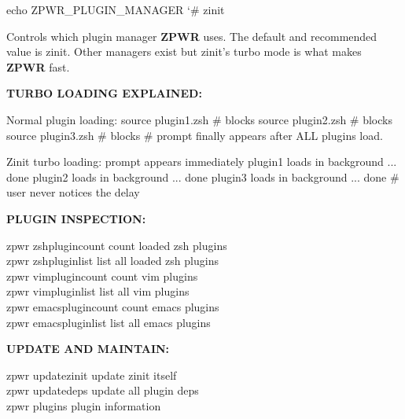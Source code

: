 \documentclass[11pt,a4paper,twoside]{book}
\begin{document}
\begin{codebox}
\color{neongreen}echo ZPWR\_PLUGIN\_MANAGER   {\char`\#} zinit\\
\end{codebox}

Controls which plugin manager \textbf{ZPWR} uses. The default and recommended value is zinit. Other managers exist but zinit's turbo mode is what makes \textbf{ZPWR} fast.


\vspace{12pt}
{\bfseries\color{neonyellow} TURBO LOADING EXPLAINED:}\vspace{4pt}

Normal plugin loading: source plugin1.zsh  \# blocks source plugin2.zsh  \# blocks source plugin3.zsh  \# blocks \# prompt finally appears after ALL plugins load.

Zinit turbo loading: prompt appears immediately plugin1 loads in background ... done plugin2 loads in background ... done plugin3 loads in background ... done \# user never notices the delay


\vspace{12pt}
{\bfseries\color{neonyellow} PLUGIN INSPECTION:}\vspace{4pt}

\begin{codebox}
\color{neongreen}zpwr zshplugincount     count loaded zsh plugins\\
\color{neongreen}zpwr zshpluginlist      list all loaded zsh plugins\\
\color{neongreen}zpwr vimplugincount     count vim plugins\\
\color{neongreen}zpwr vimpluginlist      list all vim plugins\\
\color{neongreen}zpwr emacsplugincount   count emacs plugins\\
\color{neongreen}zpwr emacspluginlist    list all emacs plugins\\
\end{codebox}


\vspace{12pt}
{\bfseries\color{neonyellow} UPDATE AND MAINTAIN:}\vspace{4pt}

\begin{codebox}
\color{neongreen}zpwr updatezinit        update zinit itself\\
\color{neongreen}zpwr updatedeps          update all plugin deps\\
\color{neongreen}zpwr plugins             plugin information\\
\end{codebox}
\end{document}
